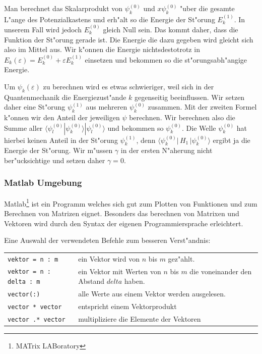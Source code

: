 \begin{refsection}
Man berechnet das Skalarprodukt von $\psi_k^{(0)}$ und $x \psi_k^{(0)}$ "uber 
die gesamte L"ange des Potenzialkastens und erh"alt so die Energie der St"orung $E_k^{(1)}$.
In unserem Fall wird jedoch $E_k^{(0)}$ gleich Null sein.
Das kommt daher, dass die Funktion der St"orung gerade ist.
Die Energie die dazu gegeben wird gleicht sich also im Mittel aus.
Wir k"onnen die Energie nichtsdestotrotz in $E_k(\varepsilon)=E_k^{(0)} + \varepsilon E_k^{(1)}$ einsetzen
und bekommen so die st"orungsabh"angige Energie.

Um $\psi_k(\varepsilon)$ zu berechnen wird es etwas schwieriger, weil sich in der Quantenmechanik die Energiezust"ande $k$ gegenseitig beeinflussen.
Wir setzen daher eine St"orung $\psi_k^{(1)}$ aus mehreren $\psi_k^{(0)}$ zusammen.
Mit der zweiten Formel k"onnen wir den Anteil der jeweiligen $\psi$ berechnen.
Wir berechnen also die Summe aller $\langle\psi_l^{(0)}|\psi_k^{(0)}\rangle|\psi_l^{(0)}\rangle$
und bekommen so $\psi_k^{(0)}$.
Die Welle $\psi_k^{(0)}$ hat hierbei keinen Anteil in der St"orung $\psi_k^{(1)}$,
denn $\langle \psi_k^{(0)}|\, H_1 \,|\psi_k^{(0)}\rangle$ ergibt ja die Energie der St"orung.
Wir m"ussen $\gamma$ in der ersten N"aherung nicht ber"ucksichtige und setzen daher $\gamma = 0$.




\subsubsection{Matlab Umgebung}

Matlab\footnote{MATrix LABoratory} ist ein Programm welches sich gut zum Plotten von Funktionen
und zum Berechnen von Matrizen eignet.
Besonders das berechnen von Matrixen und Vektoren wird durch den Syntax der eigenen Programmiersprache erleichtert.

Eine Auswahl der verwendeten Befehle zum besseren Verst"andnis:
\begin{center}
\begin{tabular}{ll}
\verb|vektor = n : m| & ein Vektor wird von $n$ bis $m$ gez"ahlt. \\
\verb|vektor = n : delta : m| & ein Vektor mit Werten von $n$ bis $m$ die voneinander den Abstand $delta$ haben. \\
\verb|vector(:)| & alle Werte aus einem Vektor werden ausgelesen. \\
\verb|vector * vector| & entspricht einem Vektorprodukt \\
\verb|vector .* vector| & multipliziere die Elemente der Vektoren
\end{tabular}
\end{center}





\end{refsection}
